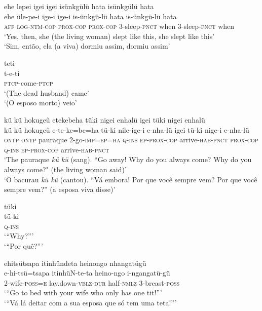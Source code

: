 \documentclass[output=paper,
modfonts,nonflat
]{langsci/langscibook}
\begin{document}
\ea ehe lepei igei igei isünkgülü hata isünkgülü hata \\[.3em]
\gll ehe üle-pe-i ige-i ige-i is-ünkgü-lü hata is-ünkgü-lü hata \\
\textsc{aff} \textsc{log-ntm-cop} \textsc{prox-cop} \textsc{prox-cop} 3-sleep-\textsc{pnct} when 3-sleep-\textsc{pnct} when \\
\glt ‘Yes, then, she (the living woman) slept like this, she slept like this’{\footnotemark}{} \\
‘Sim, então, ela (a viva) dormiu assim, dormiu assim’ \\
\z

\newpage 
\ea teti \\[.3em]
\gll t-e-ti \\
\textsc{ptcp}-come-\textsc{ptcp} \\
\glt ‘(The dead husband) came’ \\
‘(O esposo morto) veio’ \\
\z

\ea kü kü hokugeũ etekebeha tüki nigei enhalü igei tüki nigei enhalü \\[.3em]
\gll kü kü hokugeũ e-te-ke=be=ha tü-ki nile-ige-i e-nha-lü igei tü-ki nige-i  e-nha-lü \\
\textsc{ontp} \textsc{ontp} pauraque 2-go-\textsc{imp=ep=ha} \textsc{q-ins} \textsc{ep-prox-cop} arrive-\textsc{hab-pnct} \textsc{prox-cop} \textsc{q-ins} \textsc{ep-prox-cop} arrive\textsc{-hab-pnct} \\
\glt ‘The pauraque \textit{kü kü} (sang). “Go away! Why do you always come? Why do you always come?" (the living woman said)’ \\
‘O bacurau \textit{kü kü} (cantou). “Vá embora! Por que você sempre vem? Por que você sempre vem?” (a esposa viva disse)’ \\
\z

\ea tüki \\[.3em]
\gll tü-ki \\
\textsc{q-ins} \\
\glt ‘“Why?”’ \\
‘“Por quê?”’\\
\z

\ea ehitsütsapa itinhündeta heinongo nhangatügü \\[.3em]
\gll e-hi-tsü=tsapa itinhüN-te-ta heino-ngo i-ngangatü-gü \\
2-wife\textsc{-poss=e} lay.down-\textsc{vblz-dur} half\textsc{-nmlz} 3-breast-\textsc{poss} \\
\glt ‘“Go to bed with your wife who only has one tit!”’ \\
‘“Vá lá deitar com a sua esposa que só tem uma teta!”’ \\
\z
\end{document}
